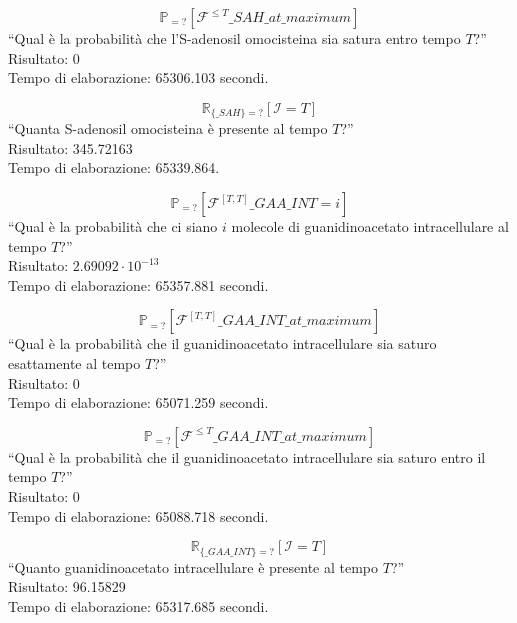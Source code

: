 \begin{equation}
	\mathbb{P}_{=?} [ \mathcal{F}^{\leq T} \_SAH\_at\_maximum ]
\end{equation}
``Qual \`e la probabilit\`a che l'S-adenosil omocisteina sia satura entro tempo $T$?''\\
Risultato: 0\\
Tempo di elaborazione: 65306.103 secondi.

\begin{equation}
	\mathbb{R}_{\{\_SAH\}=?} [ \mathcal{I}=T ]
\end{equation}
``Quanta S-adenosil omocisteina \`e presente al tempo $T$?''\\
Risultato: 345.72163\\
Tempo di elaborazione: 65339.864.

\begin{equation}
	\mathbb{P}_{=?} [ \mathcal{F}^{[T,T]} \_GAA\_INT=i ]
\end{equation}
``Qual \`e la probabilit\`a che ci siano $i$ molecole di guanidinoacetato intracellulare al tempo $T$?''\\
Risultato: $2.69092 \cdot 10^{-13}$\\
Tempo di elaborazione: 65357.881 secondi.

\begin{equation}
	\mathbb{P}_{=?} [ \mathcal{F}^{[T,T]} \_GAA\_INT\_at\_maximum ]
\end{equation}
``Qual \`e la probabilit\`a che il guanidinoacetato intracellulare sia saturo esattamente al tempo $T$?''\\
Risultato: 0\\
Tempo di elaborazione: 65071.259 secondi.

\begin{equation}
	\mathbb{P}_{=?} [ \mathcal{F}^{\leq T} \_GAA\_INT\_at\_maximum ]
\end{equation}
``Qual \`e la probabilit\`a che il guanidinoacetato intracellulare sia saturo entro il tempo $T$?''\\
Risultato: 0\\
Tempo di elaborazione: 65088.718 secondi.

\begin{equation}
	\mathbb{R}_{\{\_GAA\_INT\}=?} [ \mathcal{I}=T ]
\end{equation}
``Quanto guanidinoacetato intracellulare \`e presente al tempo $T$?''\\
Risultato: 96.15829\\
Tempo di elaborazione: 65317.685 secondi.

